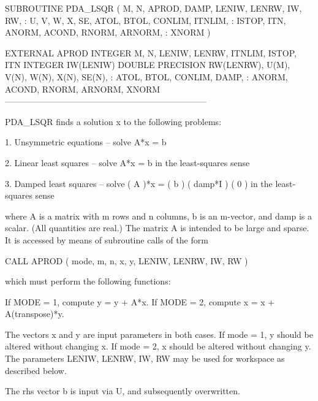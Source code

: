 \documentclass[11pt,twoside,nolof]{starlink}
\begin{document}
\begin{terminalv}
      SUBROUTINE PDA_LSQR  ( M, N, APROD, DAMP, LENIW, LENRW, IW, RW,
     :                       U, V, W, X, SE, ATOL, BTOL, CONLIM, ITNLIM,
     :                       ISTOP, ITN, ANORM, ACOND, RNORM, ARNORM,
     :                       XNORM )

      EXTERNAL           APROD
      INTEGER            M, N, LENIW, LENRW, ITNLIM, ISTOP, ITN
      INTEGER            IW(LENIW)
      DOUBLE PRECISION   RW(LENRW), U(M), V(N), W(N), X(N), SE(N),
     :                   ATOL, BTOL, CONLIM, DAMP,
     :                   ANORM, ACOND, RNORM, ARNORM, XNORM
-----------------------------------------------------------------------

     PDA_LSQR  finds a solution x to the following problems:

     1. Unsymmetric equations --    solve  A*x = b

     2. Linear least squares  --    solve  A*x = b
                                    in the least-squares sense

     3. Damped least squares  --    solve  (   A    )*x = ( b )
                                           ( damp*I )     ( 0 )
                                    in the least-squares sense

     where A is a matrix with m rows and n columns, b is an
     m-vector, and damp is a scalar.  (All quantities are real.)
     The matrix A is intended to be large and sparse.  It is accessed
     by means of subroutine calls of the form

                CALL APROD ( mode, m, n, x, y, LENIW, LENRW, IW, RW )

     which must perform the following functions:

                If MODE = 1, compute  y = y + A*x.
                If MODE = 2, compute  x = x + A(transpose)*y.

     The vectors x and y are input parameters in both cases.
     If  mode = 1,  y should be altered without changing x.
     If  mode = 2,  x should be altered without changing y.
     The parameters LENIW, LENRW, IW, RW may be used for workspace
     as described below.

     The rhs vector b is input via U, and subsequently overwritten.



\end{terminalv}
\end{document}
